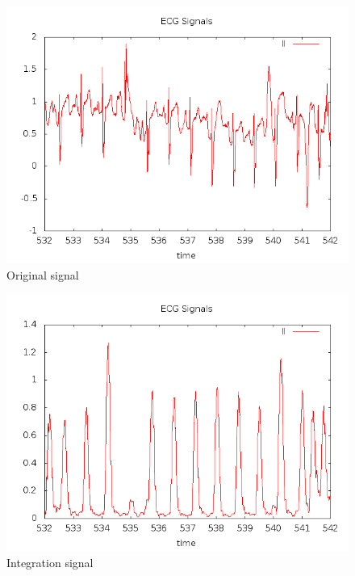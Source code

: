 \begin{figure}
        \centering
        \includegraphics[width=\textwidth]{ecg1_original.png}
        \caption{Original signal}
        \label{ecg1_original}
\end{figure}
\begin{figure}
        \centering
        \includegraphics[width=\textwidth]{ecg1_integration.png}
        \caption{Integration signal}
        \label{ecg1_integration}
\end{figure}
